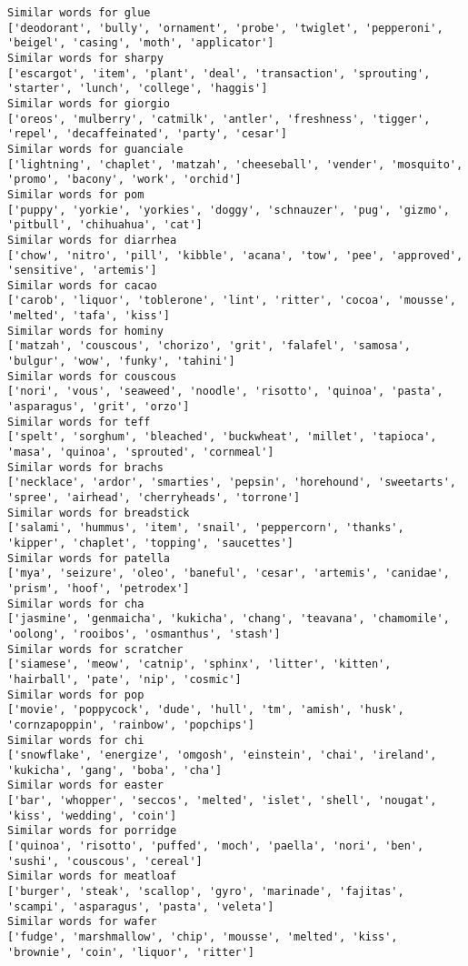 \documentclass[11pt]{article}
\begin{document}
\begin{Verbatim}[commandchars=\\\{\}]
Similar words for glue
['deodorant', 'bully', 'ornament', 'probe', 'twiglet', 'pepperoni', 'beigel', 'casing', 'moth', 'applicator']
Similar words for sharpy
['escargot', 'item', 'plant', 'deal', 'transaction', 'sprouting', 'starter', 'lunch', 'college', 'haggis']
Similar words for giorgio
['oreos', 'mulberry', 'catmilk', 'antler', 'freshness', 'tigger', 'repel', 'decaffeinated', 'party', 'cesar']
Similar words for guanciale
['lightning', 'chaplet', 'matzah', 'cheeseball', 'vender', 'mosquito', 'promo', 'bacony', 'work', 'orchid']
Similar words for pom
['puppy', 'yorkie', 'yorkies', 'doggy', 'schnauzer', 'pug', 'gizmo', 'pitbull', 'chihuahua', 'cat']
Similar words for diarrhea
['chow', 'nitro', 'pill', 'kibble', 'acana', 'tow', 'pee', 'approved', 'sensitive', 'artemis']
Similar words for cacao
['carob', 'liquor', 'toblerone', 'lint', 'ritter', 'cocoa', 'mousse', 'melted', 'tafa', 'kiss']
Similar words for hominy
['matzah', 'couscous', 'chorizo', 'grit', 'falafel', 'samosa', 'bulgur', 'wow', 'funky', 'tahini']
Similar words for couscous
['nori', 'vous', 'seaweed', 'noodle', 'risotto', 'quinoa', 'pasta', 'asparagus', 'grit', 'orzo']
Similar words for teff
['spelt', 'sorghum', 'bleached', 'buckwheat', 'millet', 'tapioca', 'masa', 'quinoa', 'sprouted', 'cornmeal']
Similar words for brachs
['necklace', 'ardor', 'smarties', 'pepsin', 'horehound', 'sweetarts', 'spree', 'airhead', 'cherryheads', 'torrone']
Similar words for breadstick
['salami', 'hummus', 'item', 'snail', 'peppercorn', 'thanks', 'kipper', 'chaplet', 'topping', 'saucettes']
Similar words for patella
['mya', 'seizure', 'oleo', 'baneful', 'cesar', 'artemis', 'canidae', 'prism', 'hoof', 'petrodex']
Similar words for cha
['jasmine', 'genmaicha', 'kukicha', 'chang', 'teavana', 'chamomile', 'oolong', 'rooibos', 'osmanthus', 'stash']
Similar words for scratcher
['siamese', 'meow', 'catnip', 'sphinx', 'litter', 'kitten', 'hairball', 'pate', 'nip', 'cosmic']
Similar words for pop
['movie', 'poppycock', 'dude', 'hull', 'tm', 'amish', 'husk', 'cornzapoppin', 'rainbow', 'popchips']
Similar words for chi
['snowflake', 'energize', 'omgosh', 'einstein', 'chai', 'ireland', 'kukicha', 'gang', 'boba', 'cha']
Similar words for easter
['bar', 'whopper', 'seccos', 'melted', 'islet', 'shell', 'nougat', 'kiss', 'wedding', 'coin']
Similar words for porridge
['quinoa', 'risotto', 'puffed', 'moch', 'paella', 'nori', 'ben', 'sushi', 'couscous', 'cereal']
Similar words for meatloaf
['burger', 'steak', 'scallop', 'gyro', 'marinade', 'fajitas', 'scampi', 'asparagus', 'pasta', 'veleta']
Similar words for wafer
['fudge', 'marshmallow', 'chip', 'mousse', 'melted', 'kiss', 'brownie', 'coin', 'liquor', 'ritter']

\end{Verbatim}
\end{document}
